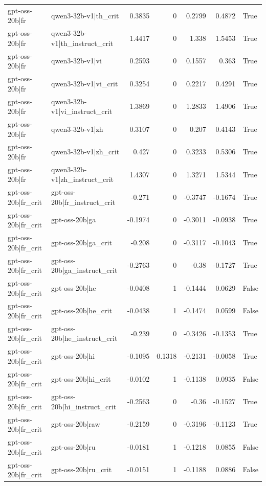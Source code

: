\begin{table}
\begin{tabular}{l l r r r r l}
gpt-oss-20b|fr & qwen3-32b-v1|th_crit & 0.3835 & 0 & 0.2799 & 0.4872 & True \\
gpt-oss-20b|fr & qwen3-32b-v1|th_instruct_crit & 1.4417 & 0 & 1.338 & 1.5453 & True \\
gpt-oss-20b|fr & qwen3-32b-v1|vi & 0.2593 & 0 & 0.1557 & 0.363 & True \\
gpt-oss-20b|fr & qwen3-32b-v1|vi_crit & 0.3254 & 0 & 0.2217 & 0.4291 & True \\
gpt-oss-20b|fr & qwen3-32b-v1|vi_instruct_crit & 1.3869 & 0 & 1.2833 & 1.4906 & True \\
gpt-oss-20b|fr & qwen3-32b-v1|zh & 0.3107 & 0 & 0.207 & 0.4143 & True \\
gpt-oss-20b|fr & qwen3-32b-v1|zh_crit & 0.427 & 0 & 0.3233 & 0.5306 & True \\
gpt-oss-20b|fr & qwen3-32b-v1|zh_instruct_crit & 1.4307 & 0 & 1.3271 & 1.5344 & True \\
gpt-oss-20b|fr_crit & gpt-oss-20b|fr_instruct_crit & -0.271 & 0 & -0.3747 & -0.1674 & True \\
gpt-oss-20b|fr_crit & gpt-oss-20b|ga & -0.1974 & 0 & -0.3011 & -0.0938 & True \\
gpt-oss-20b|fr_crit & gpt-oss-20b|ga_crit & -0.208 & 0 & -0.3117 & -0.1043 & True \\
gpt-oss-20b|fr_crit & gpt-oss-20b|ga_instruct_crit & -0.2763 & 0 & -0.38 & -0.1727 & True \\
gpt-oss-20b|fr_crit & gpt-oss-20b|he & -0.0408 & 1 & -0.1444 & 0.0629 & False \\
gpt-oss-20b|fr_crit & gpt-oss-20b|he_crit & -0.0438 & 1 & -0.1474 & 0.0599 & False \\
gpt-oss-20b|fr_crit & gpt-oss-20b|he_instruct_crit & -0.239 & 0 & -0.3426 & -0.1353 & True \\
gpt-oss-20b|fr_crit & gpt-oss-20b|hi & -0.1095 & 0.1318 & -0.2131 & -0.0058 & True \\
gpt-oss-20b|fr_crit & gpt-oss-20b|hi_crit & -0.0102 & 1 & -0.1138 & 0.0935 & False \\
gpt-oss-20b|fr_crit & gpt-oss-20b|hi_instruct_crit & -0.2563 & 0 & -0.36 & -0.1527 & True \\
gpt-oss-20b|fr_crit & gpt-oss-20b|raw & -0.2159 & 0 & -0.3196 & -0.1123 & True \\
gpt-oss-20b|fr_crit & gpt-oss-20b|ru & -0.0181 & 1 & -0.1218 & 0.0855 & False \\
gpt-oss-20b|fr_crit & gpt-oss-20b|ru_crit & -0.0151 & 1 & -0.1188 & 0.0886 & False \\

\end{tabular}
\end{table}
